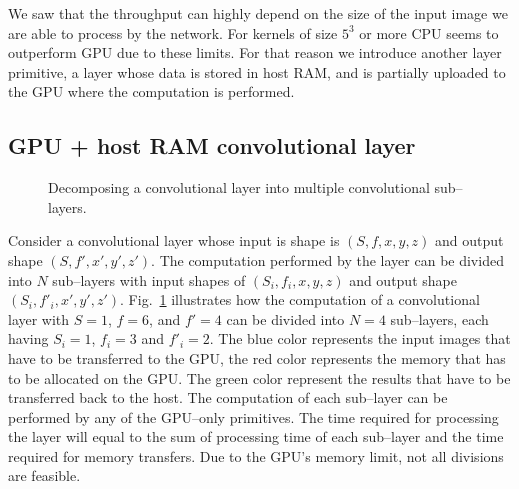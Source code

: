 \documentclass[conference]{./IEEEtran}
\begin{document}
  We saw that the throughput can highly depend on the size of the
  input image we are able to process by the network.  For kernels of
  size $5^3$ or more CPU seems to outperform GPU due to these
  limits.  For that reason we introduce another layer primitive, a
  layer whose data is stored in host RAM, and is partially uploaded to
  the GPU where the computation is performed.

\subsection{GPU + host RAM convolutional layer}

  \begin{figure}
    \centering
    \caption{Decomposing a convolutional layer into multiple
      convolutional sub--layers.}
    \label{fig:partial_exec}
  \end{figure}

  Consider a convolutional layer whose input is shape is $(S,f,x,y,z)$
  and output shape $(S,f',x',y',z')$.  The computation performed by
  the layer can be divided into $N$ sub--layers with input shapes of
  $(S_i,f_i,x,y,z)$ and output shape $(S_i,f'_i,x',y',z')$.
  Fig.~\ref{fig:partial_exec} illustrates how the computation of a
  convolutional layer with $S=1$, $f=6$, and $f'=4$ can be divided
  into $N=4$ sub--layers, each having $S_i=1$, $f_i=3$ and $f'_i=2$.
  The blue color represents the input images that have to be
  transferred to the GPU, the red color represents the memory that has
  to be allocated on the GPU.  The green color represent the results
  that have to be transferred back to the host.  The computation of
  each sub--layer can be performed by any of the GPU--only primitives.
  The time required for processing the layer will equal to the sum of
  processing time of each sub--layer and the time required for memory
  transfers.  Due to the GPU's memory limit, not all divisions are
  feasible.
\end{document}
